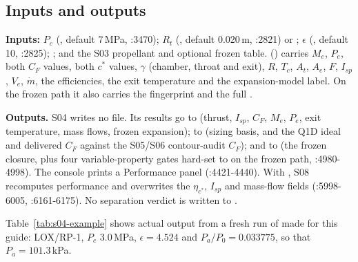 \subsection{Inputs and outputs}

\textbf{Inputs:} $P_c$ (, default 7\,MPa, :3470); $R_t$ (, default 0.020\,m, :2821) or ; $\epsilon$ (, default 10, :2825); ; and the S03 propellant and optional frozen table.  () carries $M_e$, $P_e$, both $C_F$ values, both $c^*$ values, $\gamma$ (chamber, throat and exit), $R$, $T_c$, $A_t$, $A_e$, $F$, $I_{sp}$, $V_e$, $\dot m$, the efficiencies, the exit temperature and the expansion-model label. On the frozen path it also carries the fingerprint and the full .

\textbf{Outputs.} S04 writes no file. Its results go to  (thrust, $I_{sp}$, $C_F$, $M_e$, $P_e$, exit temperature, mass flows, frozen expansion); to  (sizing basis, and the Q1D ideal and delivered $C_F$ against the S05/S06 contour-audit $C_F$); and to  (the frozen closure, plus four variable-property gates hard-set to  on the frozen path, :4980-4998). The console prints a Performance panel (:4421-4440). With , S08 recomputes performance and overwrites the $\eta_{c^*}$, $I_{sp}$ and mass-flow fields (:5998-6005, :6161-6175). No separation verdict is written to .

Table~\ref{tab:s04-example} shows actual output from a fresh run of  made for this guide: LOX/RP-1, $P_c$ 3.0\,MPa, $\epsilon=4.524$ and $P_a/P_0 = 0.033775$, so that $P_a = 101.3$\,kPa.


